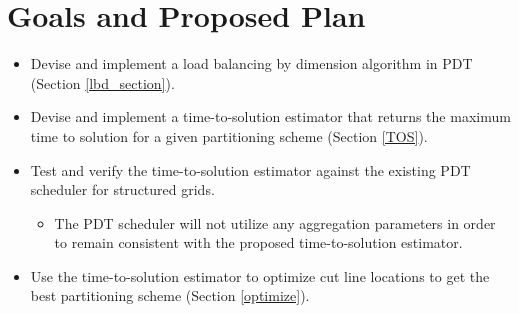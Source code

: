 \documentclass[11pt, letterpaper,titlepage,oneside]{article}
\begin{document}
\section{Goals and Proposed Plan}

\begin{itemize}
\item Devise and implement a load balancing by dimension algorithm in PDT (Section \ref{lbd_section}).
\item Devise and implement a time-to-solution estimator that returns the maximum time to solution for a given partitioning scheme (Section \ref{TOS}).
\item Test and verify the time-to-solution estimator against the existing PDT scheduler for structured grids.
\begin{itemize}
\item The PDT scheduler will not utilize any aggregation parameters in order to remain consistent with the proposed time-to-solution estimator.
\end{itemize}
\item Use the time-to-solution estimator to optimize cut line locations to get the best partitioning scheme (Section \ref{optimize}). 
\end{itemize}




\end{document}
